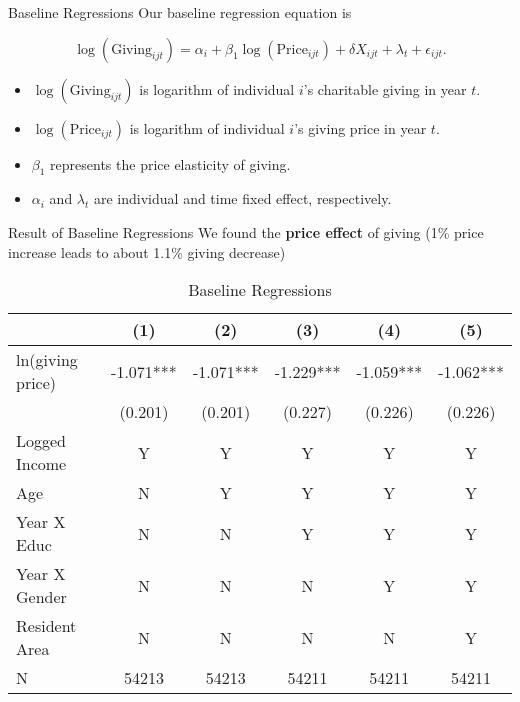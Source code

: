 \documentclass[
  ignorenonframetext,
]{beamer}
\providecommand{\tightlist}{%
  \setlength{\itemsep}{0pt}\setlength{\parskip}{0pt}}
\begin{document}
\begin{frame}{Baseline Regressions}
\protect\hypertarget{baseline-regressions}{}
Our baseline regression equation is

\[
    \log(\text{Giving}_{ijt}) = 
    \alpha_i + \beta_1 \log(\text{Price}_{ijt}) + \delta X_{ijt} + \lambda_t + \epsilon_{ijt}.
\]

\begin{itemize}
\tightlist
\item
  \(\log(\text{Giving}_{ijt})\) is logarithm of individual \(i\)'s
  charitable giving in year \(t\).
\item
  \(\log(\text{Price}_{ijt})\) is logarithm of individual \(i\)'s giving
  price in year \(t\).
\item
  \(\beta_1\) represents the price elasticity of giving.
\item
  \(\alpha_i\) and \(\lambda_t\) are individual and time fixed effect,
  respectively.
\end{itemize}
\end{frame}

\begin{frame}{Result of Baseline Regressions}
\protect\hypertarget{result-of-baseline-regressions}{}
We found the \textbf{price effect} of giving (1\% price increase leads
to about 1.1\% giving decrease)

\begin{table}

\caption{\label{tab:kableEstimateElasticity}Baseline Regressions}
\centering
\fontsize{9}{11}\selectfont
\begin{tabular}[t]{lccccc}
\toprule
 & (1) & (2) & (3) & (4) & (5)\\
\midrule
ln(giving price) & -1.071*** & -1.071*** & -1.229*** & -1.059*** & -1.062***\\
 & (0.201) & (0.201) & (0.227) & (0.226) & (0.226)\\
Logged Income & Y & Y & Y & Y & Y\\
Age & N & Y & Y & Y & Y\\
Year X Educ & N & N & Y & Y & Y\\
Year X Gender & N & N & N & Y & Y\\
Resident Area & N & N & N & N & Y\\
N & 54213 & 54213 & 54211 & 54211 & 54211\\
\bottomrule
\end{tabular}
\end{table}
\end{frame}
\end{document}
